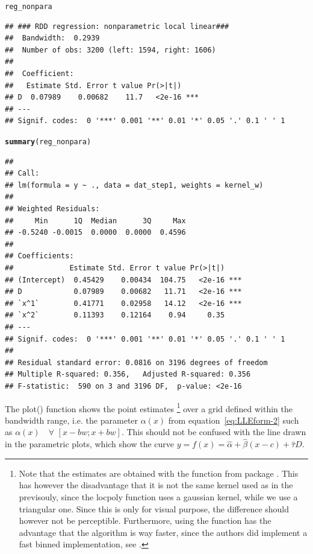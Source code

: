 \documentclass[english,nojss]{jss}\usepackage{graphicx, color}
\makeatletter
\newcommand{\hlfunctioncall}[1]{\textcolor[rgb]{0.501960784313725,0,0.329411764705882}{\textbf{#1}}}%
\newenvironment{kframe}{%
 \def\at@end@of@kframe{}%
 \ifinner\ifhmode%
  \def\at@end@of@kframe{\end{minipage}}%
  \begin{minipage}{\columnwidth}%
 \fi\fi%
 \def\FrameCommand##1{\hskip\@totalleftmargin \hskip-\fboxsep
 \colorbox{shadecolor}{##1}\hskip-\fboxsep
     \hskip-\linewidth \hskip-\@totalleftmargin \hskip\columnwidth}%
 \MakeFramed {\advance\hsize-\width
   \@totalleftmargin\z@ \linewidth\hsize
   \@setminipage}}%
 {\par\unskip\endMakeFramed%
 \at@end@of@kframe}
\newenvironment{knitrout}{}{} %
\makeatother
\begin{document}
\begin{knitrout}
\color{fgcolor}\begin{kframe}
\begin{alltt}
reg_nonpara
\end{alltt}
\begin{verbatim}
## ### RDD regression: nonparametric local linear###
## 	Bandwidth:  0.2939 
## 	Number of obs: 3200 (left: 1594, right: 1606)
## 
## 	Coefficient:
##   Estimate Std. Error t value Pr(>|t|)    
## D  0.07989    0.00682    11.7   <2e-16 ***
## ---
## Signif. codes:  0 '***' 0.001 '**' 0.01 '*' 0.05 '.' 0.1 ' ' 1
\end{verbatim}
\begin{alltt}
\hlfunctioncall{summary}(reg_nonpara)
\end{alltt}
\begin{verbatim}
## 
## Call:
## lm(formula = y ~ ., data = dat_step1, weights = kernel_w)
## 
## Weighted Residuals:
##     Min      1Q  Median      3Q     Max 
## -0.5240 -0.0015  0.0000  0.0000  0.4596 
## 
## Coefficients:
##             Estimate Std. Error t value Pr(>|t|)    
## (Intercept)  0.45429    0.00434  104.75   <2e-16 ***
## D            0.07989    0.00682   11.71   <2e-16 ***
## `x^1`        0.41771    0.02958   14.12   <2e-16 ***
## `x^2`        0.11393    0.12164    0.94     0.35    
## ---
## Signif. codes:  0 '***' 0.001 '**' 0.01 '*' 0.05 '.' 0.1 ' ' 1 
## 
## Residual standard error: 0.0816 on 3196 degrees of freedom
## Multiple R-squared: 0.356,	Adjusted R-squared: 0.356 
## F-statistic:  590 on 3 and 3196 DF,  p-value: <2e-16
\end{verbatim}
\end{kframe}
\end{knitrout}


The plot() function shows the point estimates%
\footnote{Note that the estimates are obtained with the  function
from package . This has however the disadvantage
that it is not the same kernel used as in the previsouly, since the
locpoly function uses a gaussian kernel, while we use a triangular
one. Since this is only for visual purpose, the difference should
however not be perceptible. Furthermore, using the 
function has the advantage that the algorithm is way faster, since
the authors did implement a fast binned implementation, see \citet[section 3.6]{FanGijbels1996}. %
} over a grid defined within the bandwidth range, i.e. the parameter
$\alpha(x)$ from equation~\ref{eq:LLEform-2} such as $\alpha(x)\quad$$\forall$
$[x-bw;x+bw]$. This should not be confused with the line drawn in
the parametric plots, which show the curve $y=f(x)=\hat{\alpha}+\hat{\beta}(x-c)+\hat{\tau}D$. 
\end{document}
